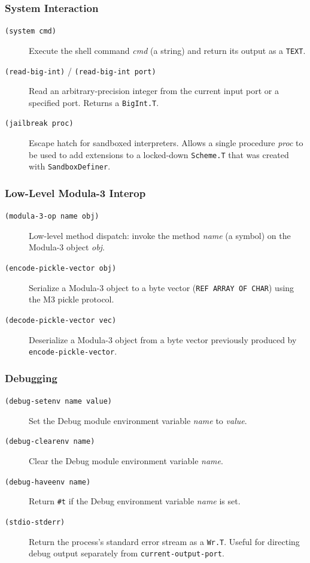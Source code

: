 \documentclass[12pt]{report}
\begin{document}
\subsubsection{System Interaction}

\nopagebreak[4]
\begin{description}
\item[{\tt (system cmd)}]
  Execute the shell command {\it cmd\/} (a string) and return its
  output as a {\tt TEXT}.
\item[{\tt (read-big-int)} / {\tt (read-big-int port)}]
  Read an arbitrary-precision integer from the current input port
  or a specified port.  Returns a {\tt BigInt.T}.
\item[{\tt (jailbreak proc)}]
  Escape hatch for sandboxed interpreters.  Allows a single
  procedure {\it proc\/} to be used to add extensions to a
  locked-down {\tt Scheme.T} that was created with
  {\tt SandboxDefiner}.
\end{description}

\subsubsection{Low-Level Modula-3 Interop}

\nopagebreak[4]
\begin{description}
\item[{\tt (modula-3-op name obj)}]
  Low-level method dispatch: invoke the method {\it name\/}
  (a symbol) on the Modula-3 object {\it obj}.
\item[{\tt (encode-pickle-vector obj)}]
  Serialize a Modula-3 object to a byte vector ({\tt REF ARRAY OF
  CHAR}) using the M3 pickle protocol.
\item[{\tt (decode-pickle-vector vec)}]
  Deserialize a Modula-3 object from a byte vector previously
  produced by {\tt encode-pickle-vector}.
\end{description}

\subsubsection{Debugging}

\nopagebreak[4]
\begin{description}
\item[{\tt (debug-setenv name value)}]
  Set the Debug module environment variable {\it name\/} to
  {\it value}.
\item[{\tt (debug-clearenv name)}]
  Clear the Debug module environment variable {\it name}.
\item[{\tt (debug-haveenv name)}]
  Return {\tt \#t} if the Debug environment variable {\it name\/}
  is set.
\item[{\tt (stdio-stderr)}]
  Return the process's standard error stream as a {\tt Wr.T}.
  Useful for directing debug output separately from
  {\tt current-output-port}.
\end{description}
\end{document}
